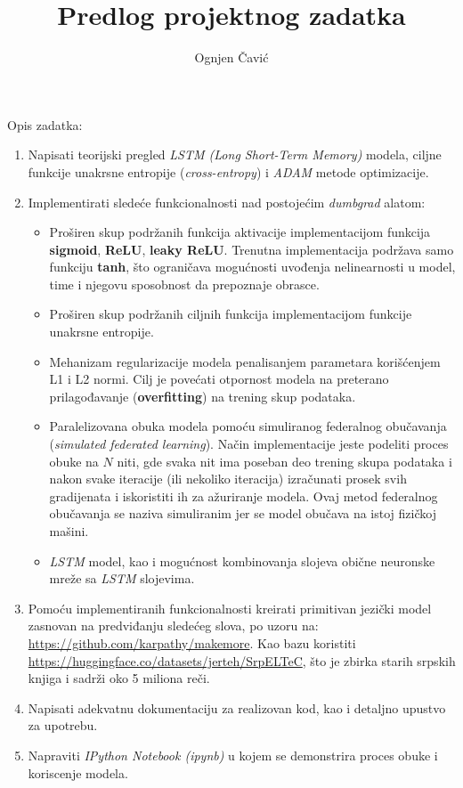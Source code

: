 \documentclass[12pt]{article}
\title{\vspace{-3cm}Predlog projektnog zadatka}
\author{Ognjen Čavić}
\date{}
\begin{document}
\maketitle
\hspace{-1cm}Opis zadatka:
\begin{enumerate}
        \item Napisati teorijski pregled \textit{LSTM (Long Short-Term Memory)} modela, ciljne funkcije unakrsne entropije (\textit{cross-entropy}) i \textit{ADAM} metode optimizacije.
        \item Implementirati sledeće funkcionalnosti nad postojećim \textit{dumbgrad} alatom:
        \begin{itemize}
          \item Proširen skup podržanih funkcija aktivacije implementacijom funkcija \textbf{sigmoid}, \textbf{ReLU}, \textbf{leaky ReLU}. Trenutna implementacija podržava samo funkciju \textbf{tanh}, što ograničava mogućnosti uvođenja nelinearnosti u model, time i njegovu sposobnost da prepoznaje obrasce.
          \item Proširen skup podržanih ciljnih funkcija implementacijom funkcije unakrsne entropije.
          \item Mehanizam regularizacije modela penalisanjem parametara korišćenjem L1 i L2 normi. Cilj je povećati otpornost modela na preterano prilagođavanje (\textbf{overfitting}) na trening skup podataka.
          \item Paralelizovana obuka modela pomoću simuliranog federalnog obučavanja (\textit{simulated federated learning}). Način implementacije jeste podeliti proces obuke na $N$ niti, gde svaka nit ima poseban deo trening skupa podataka i nakon svake iteracije (ili nekoliko iteracija) izračunati prosek svih gradijenata i iskoristiti ih za ažuriranje modela. Ovaj metod federalnog obučavanja se naziva simuliranim jer se model obučava na istoj fizičkoj mašini.
          \item \textit{LSTM} model, kao i mogućnost kombinovanja slojeva obične neuronske mreže sa \textit{LSTM} slojevima.
        \end{itemize}
        \item Pomoću implementiranih funkcionalnosti kreirati primitivan jezički model zasnovan na predviđanju sledećeg slova, po uzoru na: \url{https://github.com/karpathy/makemore}. Kao bazu koristiti \url{https://huggingface.co/datasets/jerteh/SrpELTeC}, što je zbirka starih srpskih knjiga i sadrži oko 5 miliona reči.
        \item Napisati adekvatnu dokumentaciju za realizovan kod, kao i detaljno upustvo za upotrebu.
        \item Napraviti \textit{IPython Notebook (ipynb)} u kojem se demonstrira proces obuke i koriscenje modela.
\end{enumerate}
\end{document}
